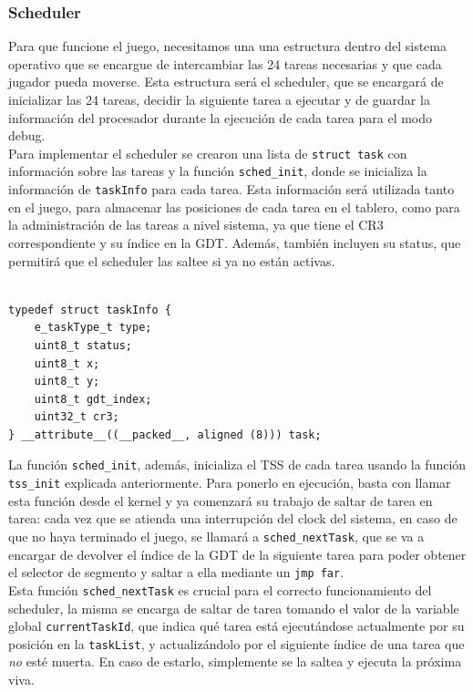 \documentclass[a4paper]{article}
\newenvironment{codesnippet}{%
	\begin{Sbox}\begin{minipage}{\textwidth}\sffamily\small}%
	{\end{minipage}\end{Sbox}%
		\begin{center}%
		\vspace{-0.4cm}\colorbox{litegrey}{\TheSbox}\end{center}\vspace{0.3cm}}
\begin{document}
\subsubsection{Scheduler}
Para que funcione el juego, necesitamos una una estructura dentro del sistema operativo que se encargue de intercambiar las 24 tareas necesarias y que cada jugador pueda moverse. Esta estructura será el scheduler, que se encargará de inicializar las 24 tareas, decidir la siguiente tarea a ejecutar y de guardar la información del procesador durante la ejecución de cada tarea para el modo debug. \\
Para implementar el scheduler se crearon una lista de {\tt struct task} con información sobre las tareas y la función {\tt sched_init}, donde se inicializa la información de {\tt taskInfo} para cada tarea. Esta información será utilizada tanto en el juego, para almacenar las posiciones de cada tarea en el tablero, como para la administración de las tareas a nivel sistema, ya que tiene el CR3 correspondiente y su índice en la GDT. Además, también incluyen su status, que permitirá que el scheduler las saltee si ya no están activas.

\begin{codesnippet}
\begin{verbatim}

typedef struct taskInfo {
    e_taskType_t type;
    uint8_t status;
    uint8_t x;
    uint8_t y;
    uint8_t gdt_index;
    uint32_t cr3;
} __attribute__((__packed__, aligned (8))) task;

\end{verbatim}
\end{codesnippet}

La función {\tt sched_init}, además, inicializa el TSS de cada tarea usando la función {\tt tss_init} explicada anteriormente. Para ponerlo en ejecución, basta con llamar esta función desde el kernel y ya comenzará su trabajo de saltar de tarea en tarea: cada vez que se atienda una interrupción del clock del sistema, en caso de que no haya terminado el juego, se llamará a {\tt sched_nextTask}, que se va a encargar de devolver el índice de la GDT de la siguiente tarea para poder obtener el selector de segmento y saltar a ella mediante un {\tt jmp far}. \\
Esta función {\tt sched_nextTask} es crucial para el correcto funcionamiento del scheduler, la misma se encarga de saltar de tarea tomando el valor de la variable global {\tt currentTaskId}, que indica qué tarea está ejecutándose actualmente por su posición en la {\tt taskList}, y actualizándolo por el siguiente índice de una tarea que \textit{no} esté muerta. En caso de estarlo, simplemente se la saltea y ejecuta la próxima viva.
\end{document}
